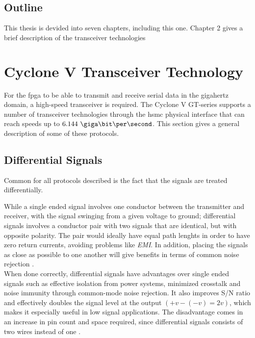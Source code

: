 \documentclass[main.tex]{subfiles}
\begin{document}
\section{Outline}
This thesis is devided into seven chapters, including this one. Chapter 2 gives a brief description of the transceiver technologies 


\chapter{Cyclone V Transceiver Technology}

For the \gls{fpga} to be able to transmit and receive serial data in the gigahertz domain, a high-speed transceiver is required. The Cyclone V GT-series supports a number of transceiver technologies through the \gls{hsmc} physical interface that can reach speeds up to $6.144\ \giga\bit\per\second$. This section gives a general description of some of these protocols.

\section{Differential Signals} \label{subsec:diffsig}

Common for all protocols described is the fact that the signals are treated differentially. 

While a single ended signal involves one conductor between the transmitter and receiver, with the signal swinging from a given voltage to ground; differential signals involves a conductor pair with two signals that are identical, but with opposite polarity. The pair would ideally have equal path lenghts in order to have zero return currents, avoiding problems like \textit{EMI}. In addition, placing the signals as close as possible to one another will give benefits in terms of common noise rejection \cite{douglas01}.\\

When done correctly, differential signals have advantages over single ended signals such as effective isolation from power systems, minimized crosstalk and noise immunity through common-mode noise rejection. It also improves S/N ratio and effectively doubles the signal level at the output $(+v - (-v) = 2v)$, which makes it especially useful in low signal applications. The disadvantage comes in an increase in pin count and space required, since differential signals consists of two wires instead of one \cite{douglas01}.
\end{document}
